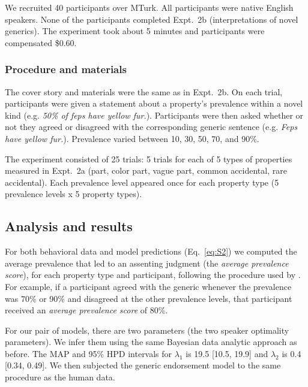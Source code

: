 \documentclass[12pt,letterpaper]{article}
\begin{document}
We recruited 40 participants over MTurk.  
All participants were native English speakers. 
None of the participants completed Expt.~2b (interpretations of novel generics).
The experiment took about 5 minutes and participants were compensated \$0.60.

\subsubsection*{Procedure and materials}

The cover story and materials were the same as in Expt.~2b.
On each trial, participants were given a statement about a property's prevalence within a novel kind (e.g. \emph{50\% of feps have yellow fur.}). Participants were then asked whether or not they agreed or disagreed with the corresponding generic sentence (e.g. \emph{Feps have yellow fur.}). Prevalence varied between 10, 30, 50, 70, and 90\%.

The experiment consisted of 25 trials: 5 trials for each of 5 types of properties measured in Expt.~2a (part, color part, vague part, common accidental, rare accidental). 
Each prevalence level appeared once for each property type (5 prevalence levels x 5 property types). 

\subsection*{Analysis and results}

For both behavioral data and model predictions (Eq.~\ref{eq:S2}) we computed the average prevalence that led to an assenting judgment (the \emph{average prevalence score}), for each property type and participant, following the procedure used by .
For example, if a participant agreed with the generic whenever the prevalence was 70\% or 90\% and disagreed at the other prevalence levels, that participant received an \emph{average prevalence score} of 80\%.

For our pair of models, there are two parameters (the two speaker optimality parameters).
We infer them using the same Bayesian data analytic approach as before. 
The MAP and 95\% HPD intervals for $\lambda_1$ is 19.5 [10.5, 19.9] and $\lambda_2$ is 0.4 [0.34, 0.49].
We then subjected the generic endorsement model to the same procedure as the human data. %
\end{document}
